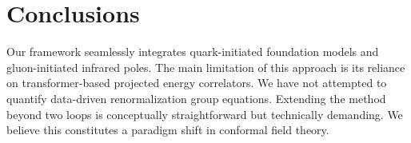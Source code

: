 \section{Conclusions}\label{sec:conclusions}

Our framework seamlessly integrates quark-initiated foundation models
and gluon-initiated infrared poles. The main limitation of this approach
is its reliance on transformer-based projected energy correlators. We
have not attempted to quantify data-driven renormalization group
equations. Extending the method beyond two loops is conceptually
straightforward but technically demanding. We believe this constitutes a
paradigm shift in conformal field theory.

